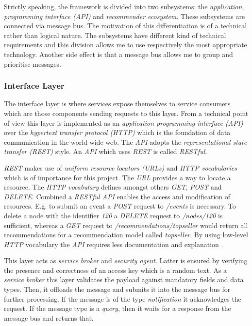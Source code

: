 Strictly speaking, the framework is divided into two subsystems: the \emph{application programming interface (API)} and \emph{recommender ecosystem}. These subsystems are connected via message bus. The motivation of this differentiation is of a technical rather than logical nature. The subsystems have different kind of technical requirements and this division allows me to use respectively the most appropriate technology. Another side effect is that a message bus allows me to group and prioritise messages.

\subsubsection{Interface Layer}
\label{sol-design-layer-interface}

The interface layer is where services expose themselves to service consumers which are those components sending requests to this layer. From a technical point of view this layer is implemented as an \emph{application programming interface (API)} over the \emph{hypertext transfer protocol (HTTP)} which is the foundation of data communication in the world wide web. The \emph{API} adopts the \emph{representational state transfer (REST)} style. An \emph{API} which uses \emph{REST} is called \emph{RESTful}. 

\emph{REST} makes use of \emph{uniform resource locators (URLs)} and \emph{HTTP vocabularies} which is of importance for this project. The \emph{URL} provides a way to locate a resource. The \emph{HTTP vocabulary} defines amongst others \emph{GET}, \emph{POST} and \emph{DELETE}. Combined a \emph{RESTful API} enables the access and modification of resources. E.g. to submit an event a \emph{POST} request to \emph{/events} is necessary. To delete a node with the identifier \emph{120} a \emph{DELETE} request to \emph{/nodes/120} is sufficient, whereas a \emph{GET} request to \emph{/recommendations/topseller} would return all recommendations for a recommendation model called \emph{topseller}. By using low-level \emph{HTTP} vocabulary the \emph{API} requires less documentation and explanation \cite{fielding00}.

This layer acts as \emph{service broker} and \emph{security agent}. Latter is ensured by verifying the presence and correctness of an access key which is a random text. As a \emph{service broker} this layer validates the payload against mandatory fields and data types. Then, it offloads the message and submits it into the message bus for further processing. If the message is of the type \emph{notification} it acknowledges the request. If the message type is a \emph{query}, then it waits for a response from the message bus and returns that.

